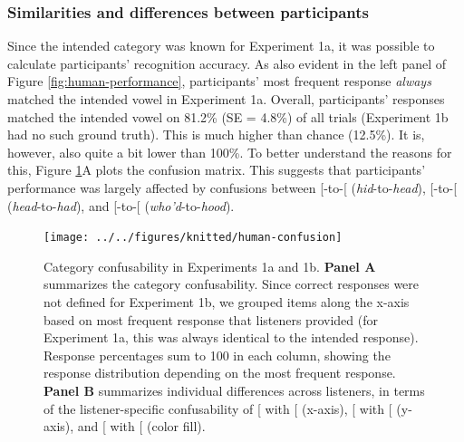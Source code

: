 \documentclass[preprint]{JASA}
\begin{document}
\subsubsection{Similarities and differences between participants}\label{similarities-and-differences-between-participants}

Since the intended category was known for Experiment 1a, it was possible to calculate participants' recognition accuracy. As also evident in the left panel of Figure \ref{fig:human-performance}, participants' most frequent response \emph{always} matched the intended vowel in Experiment 1a. Overall, participants' responses matched the intended vowel on 81.2\% (SE = 4.8\%) of all trials (Experiment 1b had no such ground truth). This is much higher than chance (12.5\%). It is, however, also quite a bit lower than 100\%. To better understand the reasons for this, Figure \ref{fig:human-confusion}A plots the confusion matrix. This suggests that participants' performance was largely affected by confusions between {[}\ipatext{ɪ}{]}-to-{[}\ipatext{ɛ}{]} (\emph{hid}-to-\emph{head}), {[}\ipatext{ɛ}{]}-to-{[}\ipatext{æ}{]} (\emph{head}-to-\emph{had}), and {[}\ipatext{u}{]}-to-{[}\ipatext{ʊ}{]} (\emph{who'd}-to-\emph{hood}).



\begin{figure}[!ht]

{\centering \texttt{[image: ../../figures/knitted/human-confusion]} 

}

\caption{Category confusability in Experiments 1a and 1b. \textbf{Panel A} summarizes the category confusability. Since correct responses were not defined for Experiment 1b, we grouped items along the x-axis based on most frequent response that listeners provided (for Experiment 1a, this was always identical to the intended response). Response percentages sum to 100 in each column, showing the response distribution depending on the most frequent response. \textbf{Panel B} summarizes individual differences across listeners, in terms of the listener-specific confusability of {[}\ipatext{ɪ}{]} with {[}\ipatext{ɛ}{]} (x-axis), {[}\ipatext{ɛ}{]} with {[}\ipatext{æ}{]} (y-axis), and {[}\ipatext{u}{]} with {[}\ipatext{ʊ}{]} (color fill).}\label{fig:human-confusion}
\end{figure}
\end{document}
